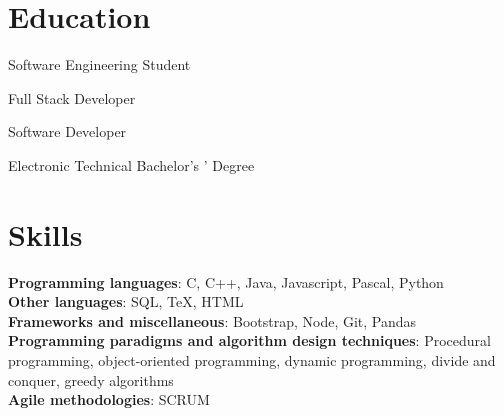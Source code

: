 \documentclass{resume}
\begin{document}
\section{Education}

Software Engineering Student

Full Stack Developer

Software Developer

Electronic Technical Bachelor's ’ Degree

\section{Skills}
\smallskip
\textbf{Programming languages}: C, C++, Java, Javascript, Pascal, Python \\
\textbf{Other languages}: SQL, TeX, HTML \\
\textbf{Frameworks and miscellaneous}: Bootstrap, Node, Git, Pandas \\
\textbf{Programming paradigms and algorithm design techniques}: Procedural programming, object-oriented programming, dynamic programming, divide and conquer, greedy algorithms \\
\textbf{Agile methodologies}: SCRUM \\
\end{document}
